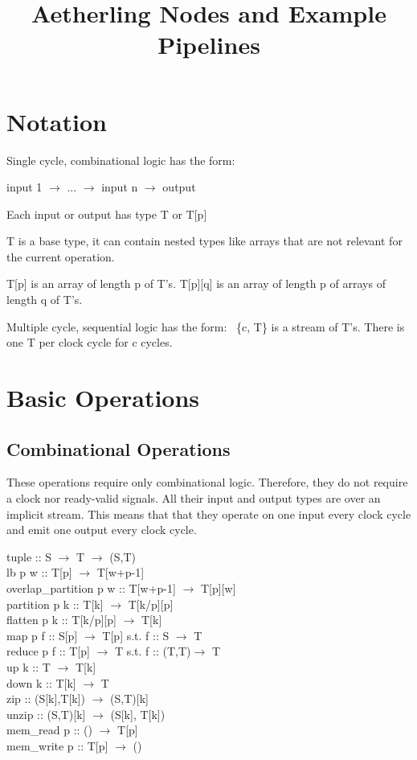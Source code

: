 \documentclass[11pt,fleqn]{article}
\numberwithin{equation}{subsection}
\begin{document}
\title{Aetherling Nodes and Example Pipelines}

\section{Notation}
Single cycle, combinational logic has the form: 
\begin{adjustwidth}{2.5 em}{0 pt}
    input 1 $\rightarrow$ ... $\rightarrow$ input n $\rightarrow$ output
\end{adjustwidth}

Each input or output has type T or T[p]

T is a base type, it can contain nested types like arrays that are not relevant
for the current operation.

T[p] is an array of length p of T's. T[p][q] is an array of length p of arrays of length q of T's.

Multiple cycle, sequential logic has the form:
\
\{c, T\} is a stream of T's. There is one T per clock cycle for c cycles.

\section{Basic Operations}

\subsection{Combinational Operations}
These operations require only combinational logic. Therefore, they do not
require a clock nor ready-valid signals. All their input and output types are over
an implicit stream. This means that that they operate on one input every clock
cycle and emit one output every clock cycle.

\begin{adjustwidth}{2.5 em}{0 pt}
    tuple :: S $\rightarrow$ T $\rightarrow$ (S,T) \\
    lb p w :: T[p] $\rightarrow$ T[w+p-1] \\
    overlap\_partition p w :: T[w+p-1] $\rightarrow$ T[p][w] \\
    partition p k :: T[k] $\rightarrow$ T[k/p][p] \\
    flatten p k :: T[k/p][p] $\rightarrow$ T[k] \\
    map p f :: S[p] $\rightarrow$ T[p]   \qquad s.t. f :: S $\rightarrow$ T \\
    reduce p f :: T[p] $\rightarrow$ T \qquad s.t. f :: (T,T)$\rightarrow$ T \\
    up k :: T $\rightarrow$ T[k] \\
    down k :: T[k] $\rightarrow$ T \\
    zip :: (S[k],T[k]) $\rightarrow$ (S,T)[k] \\
    unzip :: (S,T)[k] $\rightarrow$ (S[k], T[k]) \\
    mem\_read p :: () $\rightarrow$ T[p] \\
    mem\_write p :: T[p] $\rightarrow$ ()
\end{adjustwidth}
\end{document}
